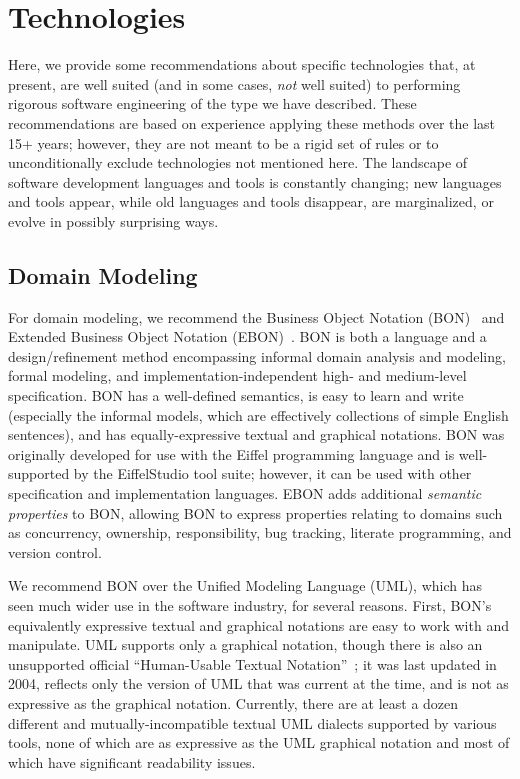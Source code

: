 \section{Technologies}
\label{sec:technologies}

Here, we provide some recommendations about specific technologies
that, at present, are well suited (and in some cases, \emph{not} well
suited) to performing rigorous software engineering of the type we
have described. These recommendations are based on experience applying
these methods over the last 15+ years; however, they are not meant to
be a rigid set of rules or to unconditionally exclude technologies not
mentioned here. The landscape of software development languages and
tools is constantly changing; new languages and tools appear, while
old languages and tools disappear, are marginalized, or evolve in
possibly surprising ways.

\subsection{Domain Modeling}


For domain modeling, we recommend the Business Object Notation
(BON)~\cite{walden1995seamless} and Extended Business Object Notation
(EBON)~. BON is both a language and a design/refinement method
encompassing informal domain analysis and modeling, formal modeling,
and implementation-independent high- and medium-level
specification. BON has a well-defined semantics, is easy to learn and
write (especially the informal models, which are effectively
collections of simple English sentences), and has equally-expressive
textual and graphical notations. BON was originally developed for use
with the Eiffel programming language and is well-supported by the
EiffelStudio tool suite; however, it can be used with other
specification and implementation languages. EBON adds additional
\emph{semantic properties} to BON, allowing BON to express properties
relating to domains such as concurrency, ownership, responsibility,
bug tracking, literate programming, and version control.

We recommend BON over the Unified Modeling Language (UML), which has
seen much wider use in the software industry, for several
reasons. First, BON's equivalently expressive textual and graphical
notations are easy to work with and manipulate. UML supports only a
graphical notation, though there is also an unsupported official
``Human-Usable Textual Notation''~\cite{HUTN}; it was last updated in
2004, reflects only the version of UML that was current at the time,
and is not as expressive as the graphical notation. Currently, there
are at least a dozen different and mutually-incompatible textual UML
dialects supported by various tools, none of which are as expressive
as the UML graphical notation and most of which have significant
readability issues.

